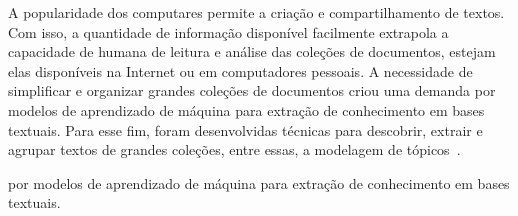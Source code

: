A popularidade dos computares permite a criação e compartilhamento de textos. Com isso, a quantidade de informação disponível facilmente extrapola a capacidade de humana de leitura e análise das coleções de documentos, estejam elas disponíveis na Internet ou em computadores pessoais. A necessidade de simplificar e organizar grandes coleções de documentos criou uma demanda por modelos de aprendizado de máquina para extração de conhecimento em bases textuais. Para esse fim, foram desenvolvidas técnicas para descobrir, extrair e agrupar textos de grandes coleções, entre essas, a modelagem de tópicos~\cite{Hofmann1999,Deerwester1990,Lee1999,Blei2012}.  %






por modelos de aprendizado de máquina para extração de conhecimento em bases textuais. 




























